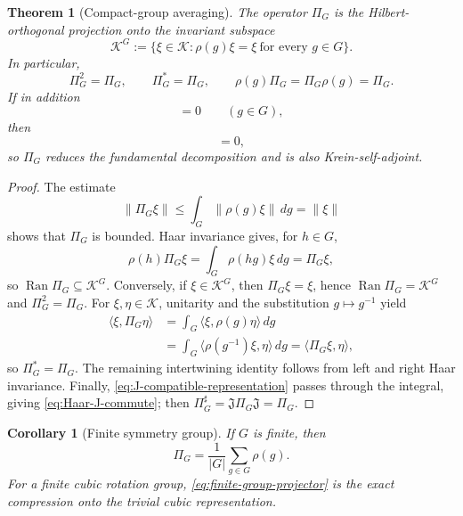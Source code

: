 \documentclass[11pt,reqno]{scrartcl}
\newcommand{\scrK}{\mathscr K}
\newcommand{\fundJ}{\mathfrak J}
\newcommand{\inner}[2]{\langle #1,#2\rangle}
\DeclareMathOperator{\Ran}{Ran}
\theoremstyle{plain}
\newtheorem{theorem}{Theorem}[section]
\newtheorem{corollary}[corollary]{Corollary}
\theoremstyle{definition}
\theoremstyle{remark}
\begin{document}
\begin{theorem}[Compact-group averaging]
\label{thm:Haar-projector}
The operator \(\Pi_G\) is the Hilbert-orthogonal projection onto the invariant
subspace
\begin{equation}
  \scrK^G
  :=\{\xi\in\scrK:\rho(g)\xi=\xi\ \text{for every }g\in G\}.
  \label{eq:invariant-subspace}
\end{equation}
In particular,
\begin{equation}
  \Pi_G^2=\Pi_G,
  \qquad
  \Pi_G^*=\Pi_G,
  \qquad
  \rho(g)\Pi_G=\Pi_G\rho(g)=\Pi_G.
  \label{eq:Haar-properties}
\end{equation}
If in addition
\begin{equation}
  [\rho(g),\fundJ]=0
  \qquad(g\in G),
  \label{eq:J-compatible-representation}
\end{equation}
then
\begin{equation}
  [\Pi_G,\fundJ]=0,
  \label{eq:Haar-J-commute}
\end{equation}
so \(\Pi_G\) reduces the fundamental decomposition and is also
Krein-self-adjoint.
\end{theorem}

\begin{proof}
The estimate
\begin{equation}
  \|\Pi_G\xi\|
  \le\int_G\|\rho(g)\xi\|\,dg
  =\|\xi\|
\end{equation}
shows that \(\Pi_G\) is bounded.  Haar invariance gives, for \(h\in G\),
\begin{equation}
  \rho(h)\Pi_G\xi
  =\int_G\rho(hg)\xi\,dg
  =\Pi_G\xi,
\end{equation}
so \(\Ran\Pi_G\subseteq\scrK^G\).  Conversely, if \(\xi\in\scrK^G\), then
\(\Pi_G\xi=\xi\), hence \(\Ran\Pi_G=\scrK^G\) and \(\Pi_G^2=\Pi_G\).
For \(\xi,\eta\in\scrK\), unitarity and the substitution
\(g\mapsto g^{-1}\) yield
\begin{align}
  \inner{\xi}{\Pi_G\eta}
  &=\int_G\inner{\xi}{\rho(g)\eta}\,dg\\
  &=\int_G\inner{\rho(g^{-1})\xi}{\eta}\,dg
  =\inner{\Pi_G\xi}{\eta},
\end{align}
so \(\Pi_G^*=\Pi_G\).  The remaining intertwining identity follows from
left and right Haar invariance.  Finally, \eqref{eq:J-compatible-representation}
passes through the integral, giving \eqref{eq:Haar-J-commute}; then
\(\Pi_G^\sharp=\fundJ\Pi_G\fundJ=\Pi_G\).
\end{proof}

\begin{corollary}[Finite symmetry group]
\label{cor:finite-group-average}
If \(G\) is finite, then
\begin{equation}
  \Pi_G=\frac1{|G|}\sum_{g\in G}\rho(g).
  \label{eq:finite-group-projector}
\end{equation}
For a finite cubic rotation group, \eqref{eq:finite-group-projector} is the
exact compression onto the trivial cubic representation.
\end{corollary}
\end{document}
